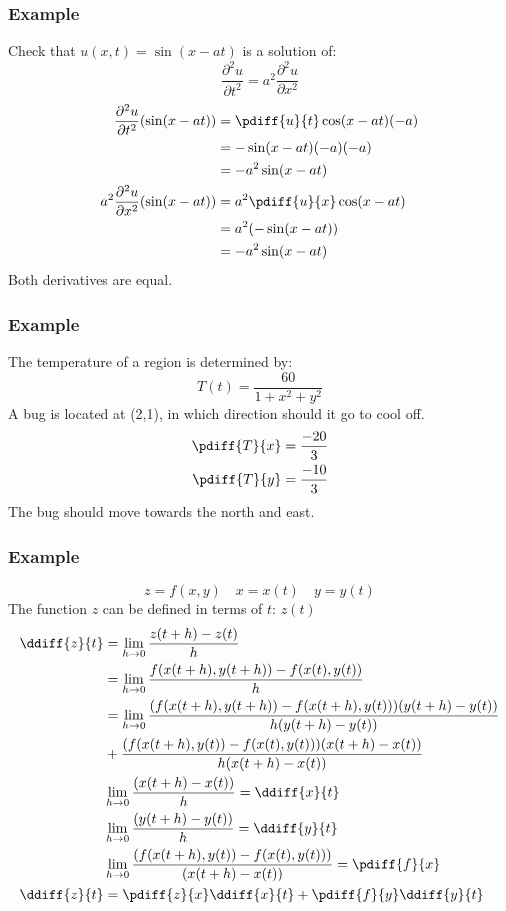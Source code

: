 \documentclass[letterpaper, 12pt]{math}
\begin{document}
\subsubsection*{Example}
Check that \( u(x,t) = \sin(x-at) \) is a solution of:
\[ \frac{\partial^2{u}}{\partial{t^2}} =
  a^2\frac{\partial^2{u}}{\partial{x^2}} \]
\begin{align*}
  \frac{\partial^2{u}}{\partial{t^2}}(\sin(x-at)) &=
    \pdiff{u}{t}\cos(x-at)(-a) \\
  &= -\sin(x-at)(-a)(-a) \\
  &= -a^2\sin(x-at) \\
  a^2\frac{\partial^2{u}}{\partial{x^2}}(\sin(x-at)) &=
    a^2\pdiff{u}{x}\cos(x-at) \\
  &= a^2(-\sin(x-at)) \\
  &= -a^2\sin(x-at)
\end{align*}
Both derivatives are equal.

\subsubsection*{Example}
The temperature of a region is determined by:
\[ T(t) = \frac{60}{1+x^2+y^2} \]
A bug is located at (2,1), in which direction should it go to cool off.
\begin{align*}
  \pdiff{T}{x} &= \frac{-20}{3} \\
  \pdiff{T}{y} &= \frac{-10}{3}
\end{align*}
The bug should move towards the north and east.

\subsubsection*{Example}
\[ z = f(x,y) \quad x = x(t) \quad y = y(t) \]
The function \( z \) can be defined in terms of \( t \): \( z(t) \)
\begin{align*}
  \ddiff{z}{t} &= \lim_{h\to0}\frac{z(t+h)-z(t)}{h} \\
  &= \lim_{h\to0}\frac{f(x(t+h),y(t+h))-f(x(t),y(t))}{h} \\
  &= \lim_{h\to0}\frac{(f(x(t+h),y(t+h))-f(x(t+h),y(t)))(y(t+h)-y(t))}
    {h(y(t+h)-y(t))} \\
  &+\frac{(f(x(t+h),y(t))-f(x(t),y(t)))(x(t+h)-x(t))}{h(x(t+h)-x(t))} \\
  & \lim_{h\to0}\frac{(x(t+h)-x(t))}{h} = \ddiff{x}{t} \\
  & \lim_{h\to0}\frac{(y(t+h)-y(t))}{h} = \ddiff{y}{t} \\
  & \lim_{h\to0}\frac{(f(x(t+h),y(t))-f(x(t),y(t)))}{(x(t+h)-x(t))} =
    \pdiff{f}{x} \\
  \ddiff{z}{t} &= \pdiff{z}{x}\ddiff{x}{t}+\pdiff{f}{y}\ddiff{y}{t}
\end{align*}
\end{document}
